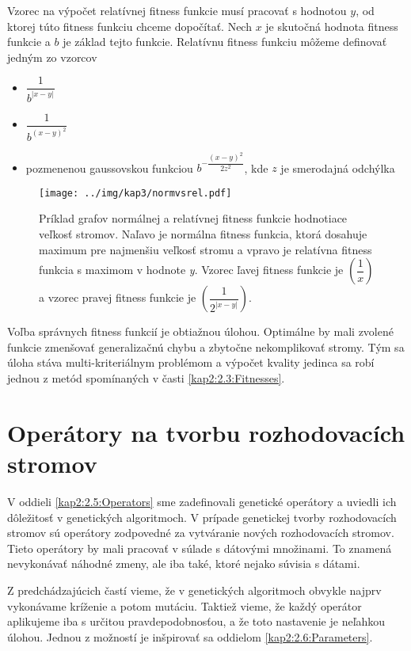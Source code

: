 Vzorec na výpočet relatívnej fitness funkcie musí pracovať s hodnotou $y$, od ktorej túto fitness funkciu chceme dopočítať. Nech $x$ je skutočná hodnota fitness funkcie a $b$ je základ tejto funkcie. Relatívnu fitness funkciu môžeme definovať jedným zo vzorcov
\begin{itemize}
\item $\dfrac{1}{b^{|x-y|}}$
\item $\dfrac{1}{b^{(x-y)^2}}$
\item pozmenenou gaussovskou funkciou $b^{-\dfrac{(x-y)^2}{2z^2}}$, kde $z$ je smerodajná odchýlka
\end{itemize}

\begin{figure}[h]
\centering
\centerline{\mbox{\texttt{[image: ../img/kap3/normvsrel.pdf]}}}
\caption{Príklad grafov normálnej a relatívnej fitness funkcie hodnotiace veľkosť stromov. Naľavo je normálna fitness funkcia, ktorá dosahuje maximum pre najmenšiu veľkosť stromu a vpravo je relatívna fitness funkcia s maximom v hodnote \emph{y}. Vzorec ľavej fitness funkcie je $\left(\dfrac{1}{x}\right)$ a vzorec pravej fitness funkcie je $\left(\dfrac{1}{2^{|x-y|}}\right)$.}\label{fig:normalvsrelative}
\end{figure}

Voľba správnych fitness funkcií je obtiažnou úlohou. Optimálne by mali zvolené funkcie zmenšovať generalizačnú chybu a zbytočne nekomplikovať stromy. Tým sa úloha stáva multi-kriteriálnym problémom a výpočet kvality jedinca sa robí jednou z metód spomínaných v časti \ref{kap2:2.3:Fitnesses}.
\section{Operátory na tvorbu rozhodovacích stromov}\label{kap3:3.4:Operators}
V oddieli \ref{kap2:2.5:Operators} sme zadefinovali genetické operátory a uviedli ich dôležitosť v genetických algoritmoch. V prípade genetickej tvorby rozhodovacích stromov sú operátory zodpovedné za vytváranie nových rozhodovacích stromov. Tieto operátory by mali pracovať v súlade s dátovými množinami. To znamená nevykonávať náhodné zmeny, ale iba také, ktoré nejako súvisia s dátami.

Z predchádzajúcich častí vieme, že v genetických algoritmoch obvykle najprv vykonávame kríženie a potom mutáciu. Taktiež vieme, že každý operátor aplikujeme iba s určitou pravdepodobnosťou, a že toto nastavenie je neľahkou úlohou. Jednou z možností je inšpirovať sa oddielom \ref{kap2:2.6:Parameters}.

